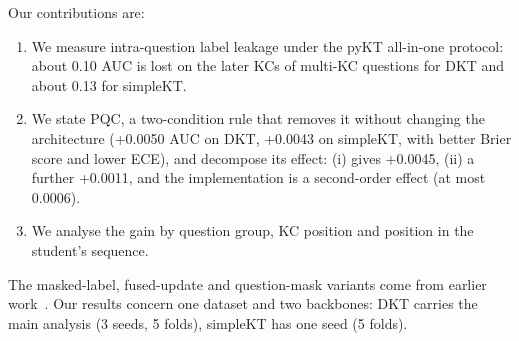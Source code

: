 Our contributions are:
\begin{enumerate}
  \item We measure intra-question label leakage under the pyKT all-in-one protocol: about 0.10 AUC is lost on the later KCs of multi-KC questions for DKT and about 0.13 for simpleKT.
  \item We state PQC, a two-condition rule that removes it without changing the architecture (+0.0050 AUC on DKT, +0.0043 on simpleKT, with better Brier score and lower ECE), and decompose its effect: (i) gives +0.0045, (ii) a further +0.0011, and the implementation is a second-order effect (at most 0.0006).
  \item We analyse the gain by question group, KC position and position in the student's sequence.
\end{enumerate}
The masked-label, fused-update and question-mask variants come from earlier work~\cite{DBLP:conf/csedu/BadranP25a,badran2026enhancing}. Our results concern one dataset and two backbones: DKT carries the main analysis (3 seeds, 5 folds), simpleKT has one seed (5 folds).